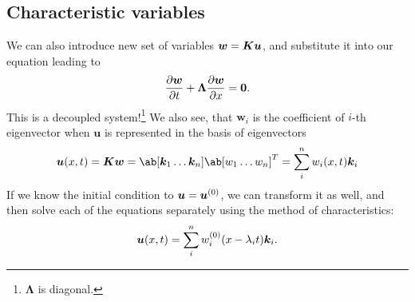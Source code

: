 \documentclass[justified, nobib]{tufte-handout}
\begin{document}
\subsection{Characteristic variables}
We can also introduce new set of variables \(\bm{w} = \bm{K}\bm{u}\), and
substitute it into our equation leading to
\[
	\pdv{\bm{w}}{t} + \bm{\Lambda}\pdv{\bm{w}}{x} = \bm{0}.
\]
This is a decoupled system!\footnote{\(\bm\Lambda\) is diagonal.}
We also see, that \(\bm{w}_i\) is the coefficient of \(i\)-th eigenvector
when \(\bm{u}\) is represented in the basis of eigenvectors
\[
	\bm{u}(x,t) = \bm{K}\bm{w} = \ab[\vb{k}_1 \dots \vb{k}_n]{\ab[w_1 \dots w_n]}^T=
	\sum\limits_i^n w_i(x,t)\vb{k}_i
\]
If we know the initial condition to \(\bm{u} = \bm{u}^{(0)}\), we can transform it
as well, and then solve each of the equations separately using the
method of characteristics:
\[
	\bm{u}(x,t) = \sum\limits_i^n w^{(0)}_i(x-\lambda_i t)\bm{k}_i.
\]
\end{document}
